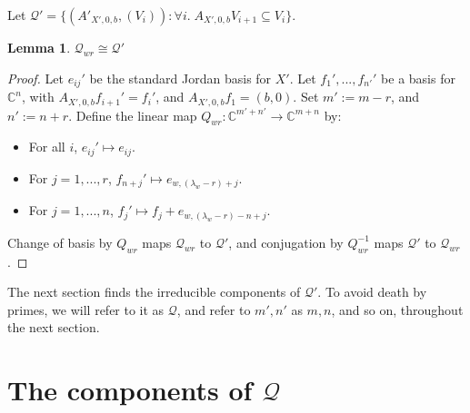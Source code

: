 \documentclass[12pt,psamsfonts]{article}
\newtheorem{lemma}[theorem]{Lemma}
\begin{document}
Let \(\mathcal{Q}' = \{(A'_{X', 0, b}, (V_i)) : \forall i. \; A_{X', 0, b} V_{i + 1} \subseteq V_i\}\).
\begin{lemma}\label{a_zero}
    \(\mathcal{Q}_{wr} \cong \mathcal{Q}'\)
\end{lemma}
\begin{proof}
    Let \(e_{ij}'\) be the standard Jordan basis for \(X'\).
    Let \(f_1', ..., f_{n'}'\) be a basis for \(\mathbb{C}^n\), with \(A_{X', 0, b} f_{i + 1}' = f_i'\), and \(A_{X', 0, b} f_1 = (b, 0)\).
    Set \(m' := m - r\), and \(n' := n + r\).
    Define the linear map \(Q_{wr} : \mathbb{C}^{m' + n'} \to \mathbb{C}^{m + n}\) by:
    \begin{itemize}
        \item For all \(i\), \(e_{ij}' \mapsto e_{ij}\).
        \item For \(j = 1, ..., r\), \(f_{n + j}' \mapsto e_{w,(\lambda_w - r) + j}\).
        \item For \(j = 1, ..., n\), \(f_j' \mapsto f_j + e_{w, (\lambda_w - r) - n + j}\).
    \end{itemize}
    Change of basis by \(Q_{wr}\) maps \(\mathcal{Q}_{wr}\) to \(\mathcal{Q}'\), and conjugation by \(Q_{wr}^{-1}\) maps \(\mathcal{Q}'\) to \(\mathcal{Q}_{wr}\).
\end{proof}
The next section finds the irreducible components of \(\mathcal{Q}'\).
To avoid death by primes, we will refer to it as \(\mathcal{Q}\), and refer to \(m',n'\) as \(m,n\), and so on, throughout the next section.

\section{The components of \texorpdfstring{\(\mathcal{Q}\)}{Q}}\label{q_comp}
\end{document}
